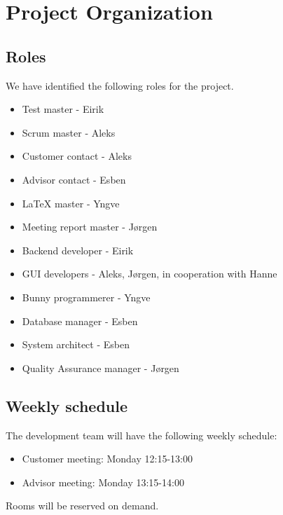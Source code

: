 \chapter{Project Organization}





\section{Roles}
We have identified the following roles for the project. 
\begin{itemize}
\item Test master - Eirik
\item Scrum master - Aleks
\item Customer contact - Aleks
\item Advisor contact - Esben
\item \LaTeX { }master - Yngve
\item Meeting report master - Jørgen
\item Backend developer - Eirik
\item GUI developers - Aleks, Jørgen, in cooperation with Hanne
\item Bunny programmerer - Yngve
\item Database manager - Esben
\item System architect - Esben
\item Quality Assurance manager - Jørgen 
\end{itemize}




\section{Weekly schedule}

The development team will have the following weekly schedule:

\begin{itemize}
\item Customer meeting: Monday 12:15-13:00
\item Advisor meeting: Monday 13:15-14:00
\end{itemize}
Rooms will be reserved on demand.


